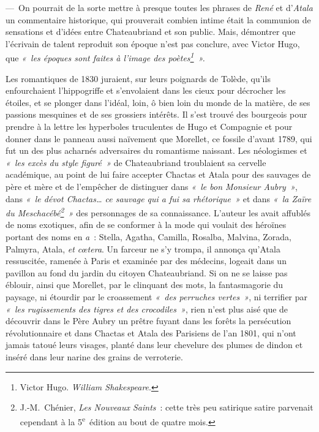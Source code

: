 \documentclass[french,twoside]{book} %
\begin{document}
\label{p599}— On pourrait de la sorte mettre à presque toutes les phrases de \emph{René} et d’\emph{Atala} un commentaire historique, qui prouverait combien intime était la communion de sensations et d’idées entre Chateaubriand et son public. Mais, démontrer que l’écrivain de talent reproduit son époque n’est pas conclure, avec Victor Hugo, que \emph{« les époques sont faites à l’image des poètes\footnote{Victor Hugo. \emph{William Shakespeare}.} ».}\par
Les romantiques de 1830 juraient, sur leurs poignards de Tolède, qu’ils enfourchaient l’hippogriffe et s’envolaient dans les cieux pour décrocher les étoiles, et se plonger dans l’idéal, loin, ô bien loin du monde de la matière, de ses passions mesquines et de ses grossiers intérêts. Il s’est trouvé des bourgeois pour prendre à la lettre les hyperboles truculentes de Hugo et Compagnie et pour donner dans le panneau aussi naïvement que Morellet, ce fossile d’avant 1789, qui fut un des plus acharnés adversaires du romantisme naissant. Les néologismes et \emph{« les excès du style figuré »} de Chateaubriand troublaient sa cervelle académique, au point de lui faire accepter Chactas et Atala pour des sauvages de père et mère et de l’empêcher de distinguer dans \emph{« le bon Monsieur Aubry »}, dans \emph{« le dévot Chactas… ce sauvage qui a fui sa rhétorique »} et dans \emph{« la Zaïre du Meschacébé\footnote{J.-M. Chénier, \emph{Les Nouveaux Saints} : cette très peu satirique satire parvenait cependant à la 5\textsuperscript{e} édition au bout de quatre mois.} »} des personnages de sa connaissance. L’auteur les avait affublés de noms exotiques, afin de se conformer à la mode qui voulait des héroïnes portant des noms en {\itshape a} : Stella, Agatha, Camilla, Rosalba, Malvina, Zorada, Palmyra, Atala, {\itshape et cœtera}. Un farceur ne s’y trompa, il annonça qu’Atala ressuscitée, ramenée à Paris et examinée par des médecins, logeait dans un pavillon au fond du jardin du citoyen Chateaubriand. Si on ne se laisse pas éblouir, ainsi que Morellet, par le clinquant des mots, la fantasmagorie du paysage, ni étourdir par le croassement \emph{« des perruches vertes »}, ni terrifier par \emph{« les rugissements des tigres et des crocodiles »}, rien n’est plus aisé que de découvrir dans le Père Aubry un prêtre fuyant dans les forêts la persécution révolutionnaire et dans Chactas et Atala des Parisiens de l’an 1801, qui n’ont jamais tatoué leurs visages, planté dans leur chevelure des plumes de dindon et inséré dans leur narine des grains de verroterie.\par
\end{document}
